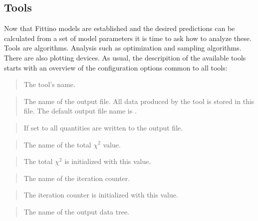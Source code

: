 \documentclass[letterpaper,10pt,english]{sphinxmanual}
\begin{document}
\subsection{Tools}
\label{tools:tools}\label{tools::doc}
Now that Fittino models are established and the desired predictions can be calculated from a set of
model parameters it is time to ask how to analyze these. Tools are algorithms. Analysis such as
optimization and sampling algorithms. There are also plotting devices.  As usual, the descripition
of the available tools starts with an overview of the configuration options common to all tools:

\begin{quote}

The tool's name.
\end{quote}

\begin{quote}

The name of the output file. All data produced by the tool is stored in this file. The default
output file name is .
\end{quote}

\begin{quote}

If set to  all quantities are written to the output file.
\end{quote}

\begin{quote}

The name of the total \(\chi^2\) value.
\end{quote}

\begin{quote}

The total \(\chi^2\) is initialized with this value.
\end{quote}

\begin{quote}

The name of the iteration counter.
\end{quote}

\begin{quote}

The iteration counter is initialized with this value.
\end{quote}

\begin{quote}

The name of the output data tree.
\end{quote}
\end{document}
